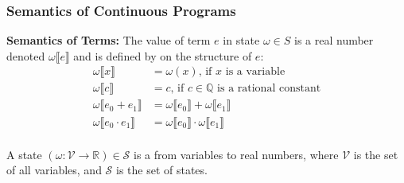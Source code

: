 \subsubsection{Semantics of Continuous Programs}

\textbf{Semantics of Terms:}
The value of term $e$ in state $\omega \in S$ is a real number denoted 
$\omega\llbracket e \rrbracket$ and is defined by  on the 
structure of $e$:
\begin{align*}
  \omega\llbracket x \rrbracket &= \omega(x) 
    \text{, if $x$ is a variable} \\
  \omega\llbracket c \rrbracket &= c 
    \text{, if $c \in \mathds{Q}$ is a rational constant}\\
  \omega\llbracket e_0 + e_1 \rrbracket &= \omega\llbracket e_0 \rrbracket + 
    \omega\llbracket e_1 \rrbracket \\
  \omega\llbracket e_0 \cdot e_1 \rrbracket &= \omega\llbracket e_0 \rrbracket 
    \cdot \omega\llbracket e_1 \rrbracket \\
\end{align*}

A state $(\omega: \mathscr{V} \to \mathds{R}) \in \mathscr{S}$ 
is a  from variables to real numbers, where
$\mathscr{V}$ is the set of all variables, 
and $\mathscr{S}$ is the set of states.

